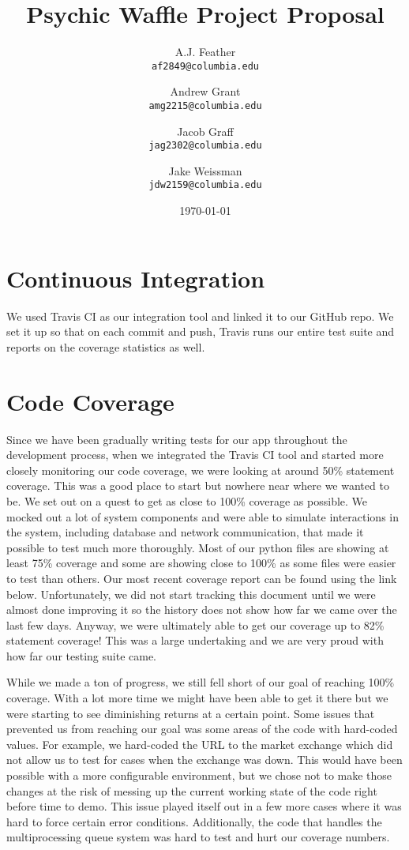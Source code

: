 \documentclass{article}
\title{Psychic Waffle Project Proposal}
\author{
    A.J. Feather\\
    \texttt{af2849@columbia.edu}
    \and
    Andrew Grant\\
    \texttt{amg2215@columbia.edu}
    \and
    Jacob Graff\\
    \texttt{jag2302@columbia.edu}
    \and
    Jake Weissman\\
    \texttt{jdw2159@columbia.edu}
}
\date{\today}
\begin{document}
\maketitle

\section{Continuous Integration}
We used Travis CI as our integration tool and linked it to our GitHub repo. We set it up so that on each commit and push, Travis runs our entire test suite and reports on the coverage statistics as well.

\section{Code Coverage}
Since we have been gradually writing tests for our app throughout the development process, when we integrated the Travis CI tool and started more closely monitoring our code coverage, we were looking at around 50\% statement coverage. This was a good place to start but nowhere near where we wanted to be. We set out on a quest to get as close to 100\% coverage as possible. We mocked out a lot of system components and were able to simulate interactions in the system, including database and network communication, that made it possible to test much more thoroughly. Most of our python files are showing at least 75\% coverage and some are showing close to 100\% as some files were easier to test than others. Our most recent coverage report can be found using the link below. Unfortunately, we did not start tracking this document until we were almost done improving it so the history does not show how far we came over the last few days. Anyway, we were ultimately able to get our coverage up to 82\% statement coverage! This was a large undertaking and we are very proud with how far our testing suite came.

While we made a ton of progress, we still fell short of our goal of reaching 100\% coverage. With a lot more time we might have been able to get it there but we were starting to see diminishing returns at a certain point. Some issues that prevented us from reaching our goal was some areas of the code with hard-coded values. For example, we hard-coded the URL to the market exchange which did not allow us to test for cases when the exchange was down. This would have been possible with a more configurable environment, but we chose not to make those changes at the risk of messing up the current working state of the code right before time to demo. This issue played itself out in a few more cases where it was hard to force certain error conditions. Additionally, the code that handles the multiprocessing queue system was hard to test and hurt our coverage numbers.
\end{document}
